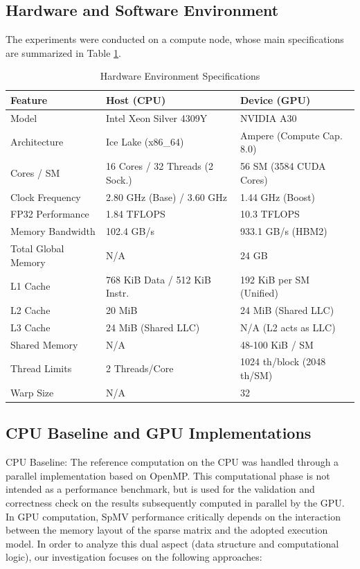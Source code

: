 \documentclass[conference]{IEEEtran}
\begin{document}
\subsection{Hardware and Software Environment}
The experiments were conducted on a compute node, whose main specifications are summarized in Table \ref{tab:hardware}.

\begin{table}[htbp]
\caption{Hardware Environment Specifications}
\begin{center}
\footnotesize
\setlength{\tabcolsep}{3pt}
\begin{tabular}{|l|p{3.5cm}|p{3.5cm}|}
\hline
Feature & Host (CPU) & Device (GPU) \\
\hline
Model & Intel Xeon Silver 4309Y & NVIDIA A30 \\
Architecture & Ice Lake (x86\_64) & Ampere (Compute Cap. 8.0) \\
Cores / SM & 16 Cores / 32 Threads (2 Sock.) & 56 SM (3584 CUDA Cores) \\
Clock Frequency & 2.80 GHz (Base) / 3.60 GHz & 1.44 GHz (Boost) \\
FP32 Performance & 1.84 TFLOPS & 10.3 TFLOPS \\
Memory Bandwidth & 102.4 GB/s & 933.1 GB/s (HBM2) \\
Total Global Memory & N/A & 24 GB \\
L1 Cache & 768 KiB Data / 512 KiB Instr. & 192 KiB per SM (Unified) \\
L2 Cache & 20 MiB & 24 MiB (Shared LLC) \\
L3 Cache & 24 MiB (Shared LLC) &  N/A (L2 acts as LLC) \\
Shared Memory & N/A & 48-100 KiB / SM \\
Thread Limits & 2 Threads/Core  & 1024 th/block (2048 th/SM) \\
Warp Size & N/A & 32 \\
\hline
\end{tabular}
\label{tab:hardware}
\end{center}
\end{table}
\subsection{CPU Baseline and GPU Implementations}
CPU Baseline: The reference computation on the CPU was handled through a parallel implementation based on OpenMP. This computational phase is not intended as a performance benchmark, but is used for the validation and correctness check on the results subsequently computed in parallel by the GPU.\\
In GPU computation, SpMV performance critically depends on the interaction between the memory layout of the sparse matrix and the adopted execution model. In order to analyze this dual aspect (data structure and computational logic), our investigation focuses on the following approaches:\\
\end{document}
